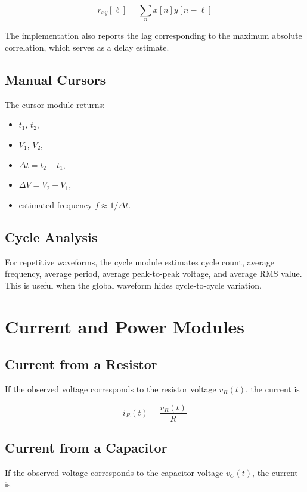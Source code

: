 \documentclass[conference]{IEEEtran}
\begin{document}
\begin{equation}
r_{xy}[\ell] = \sum_n x[n]y[n-\ell]
\end{equation}

The implementation also reports the lag corresponding to the maximum absolute correlation, which serves as a delay estimate.

\subsection{Manual Cursors}
The cursor module returns:

\begin{itemize}
    \item $t_1$, $t_2$,
    \item $V_1$, $V_2$,
    \item $\Delta t = t_2 - t_1$,
    \item $\Delta V = V_2 - V_1$,
    \item estimated frequency $f \approx 1/\Delta t$.
\end{itemize}

\subsection{Cycle Analysis}
For repetitive waveforms, the cycle module estimates cycle count, average frequency, average period, average peak-to-peak voltage, and average RMS value. This is useful when the global waveform hides cycle-to-cycle variation.

\section{Current and Power Modules}
\subsection{Current from a Resistor}
If the observed voltage corresponds to the resistor voltage $v_R(t)$, the current is

\begin{equation}
i_R(t) = \frac{v_R(t)}{R}
\end{equation}

\subsection{Current from a Capacitor}
If the observed voltage corresponds to the capacitor voltage $v_C(t)$, the current is
\end{document}
